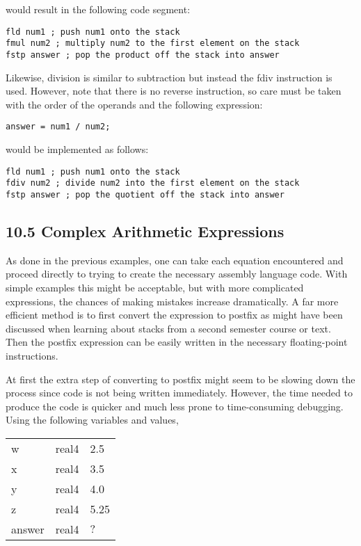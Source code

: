 \documentclass[10pt]{article}
\begin{document}
would result in the following code segment:

\begin{verbatim}
fld num1 ; push num1 onto the stack
fmul num2 ; multiply num2 to the first element on the stack
fstp answer ; pop the product off the stack into answer
\end{verbatim}

Likewise, division is similar to subtraction but instead the fdiv instruction is used. However, note that there is no reverse instruction, so care must be taken with the order of the operands and the following expression:

\begin{verbatim}
answer = num1 / num2;
\end{verbatim}

would be implemented as follows:

\begin{verbatim}
fld num1 ; push num1 onto the stack
fdiv num2 ; divide num2 into the first element on the stack
fstp answer ; pop the quotient off the stack into answer
\end{verbatim}

\subsection*{10.5 Complex Arithmetic Expressions}
As done in the previous examples, one can take each equation encountered and proceed directly to trying to create the necessary assembly language code. With simple examples this might be acceptable, but with more complicated expressions, the chances of making mistakes increase dramatically. A far more efficient method is to first convert the expression to postfix as might have been discussed when learning about stacks from a second semester course or text. Then the postfix expression can be easily written in the necessary floating-point instructions.

At first the extra step of converting to postfix might seem to be slowing down the process since code is not being written immediately. However, the time needed to produce the code is quicker and much less prone to time-consuming debugging. Using the following variables and values,

\begin{center}
\begin{tabular}{lll}
w & real4 & 2.5 \\
x & real4 & 3.5 \\
y & real4 & 4.0 \\
z & real4 & 5.25 \\
answer & real4 & $?$ \\
\end{tabular}
\end{center}
\end{document}
